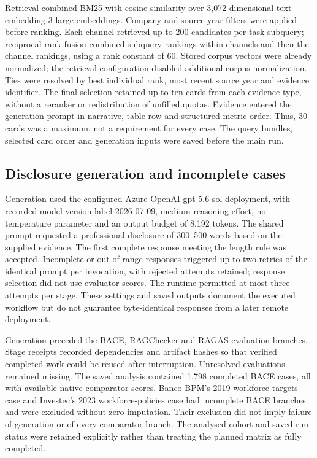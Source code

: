 \documentclass[11pt,a4paper]{article}
\begin{document}
Retrieval combined BM25 with cosine similarity over 3,072-dimensional text-embedding-3-large embeddings. Company and source-year filters were applied before ranking. Each channel retrieved up to 200 candidates per task subquery; reciprocal rank fusion combined subquery rankings within channels and then the channel rankings, using a rank constant of 60. Stored corpus vectors were already normalized; the retrieval configuration disabled additional corpus normalization. Ties were resolved by best individual rank, most recent source year and evidence identifier. The final selection retained up to ten cards from each evidence type, without a reranker or redistribution of unfilled quotas. Evidence entered the generation prompt in narrative, table-row and structured-metric order. Thus, 30 cards was a maximum, not a requirement for every case. The query bundles, selected card order and generation inputs were saved before the main run.

\subsection*{Disclosure generation and incomplete cases}

Generation used the configured Azure OpenAI gpt-5.6-sol deployment, with recorded model-version label 2026-07-09, medium reasoning effort, no temperature parameter and an output budget of 8,192 tokens. The shared prompt requested a professional disclosure of 300--500 words based on the supplied evidence. The first complete response meeting the length rule was accepted. Incomplete or out-of-range responses triggered up to two retries of the identical prompt per invocation, with rejected attempts retained; response selection did not use evaluator scores. The runtime permitted at most three attempts per stage. These settings and saved outputs document the executed workflow but do not guarantee byte-identical responses from a later remote deployment.

Generation preceded the BACE, RAGChecker and RAGAS evaluation branches. Stage receipts recorded dependencies and artifact hashes so that verified completed work could be reused after interruption. Unresolved evaluations remained missing. The saved analysis contained 1,798 completed BACE cases, all with available native comparator scores. Banco BPM's 2019 workforce-targets case and Investec's 2023 workforce-policies case had incomplete BACE branches and were excluded without zero imputation. Their exclusion did not imply failure of generation or of every comparator branch. The analysed cohort and saved run status were retained explicitly rather than treating the planned matrix as fully completed.
\end{document}
